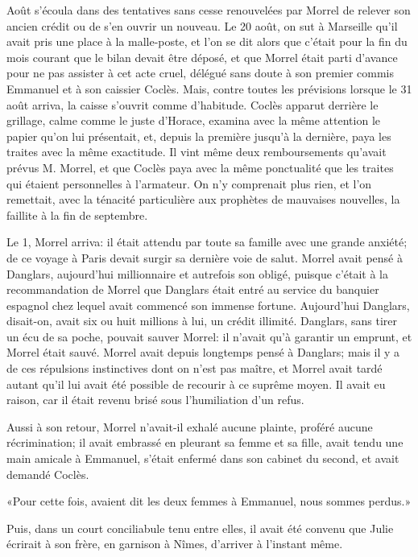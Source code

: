 Août s'écoula dans des tentatives sans cesse renouvelées par Morrel de relever son ancien crédit ou de s'en ouvrir un nouveau. Le 20 août, on sut à Marseille qu'il avait pris une place à la malle-poste, et l'on se dit alors que c'était pour la fin du mois courant que le bilan devait être déposé, et que Morrel était parti d'avance pour ne pas assister à cet acte cruel, délégué sans doute à son premier commis Emmanuel et à son caissier Coclès. Mais, contre toutes les prévisions lorsque le 31 août arriva, la caisse s'ouvrit comme d'habitude. Coclès apparut derrière le grillage, calme comme le juste d'Horace, examina avec la même attention le papier qu'on lui présentait, et, depuis la première jusqu'à la dernière, paya les traites avec la même exactitude. Il vint même deux remboursements qu'avait prévus M. Morrel, et que Coclès paya avec la même ponctualité que les traites qui étaient personnelles à l'armateur. On n'y comprenait plus rien, et l'on remettait, avec la ténacité particulière aux prophètes de mauvaises nouvelles, la faillite à la fin de septembre.

Le 1\ier, Morrel arriva: il était attendu par toute sa famille avec une grande anxiété; de ce voyage à Paris devait surgir sa dernière voie de salut. Morrel avait pensé à Danglars, aujourd'hui millionnaire et autrefois son obligé, puisque c'était à la recommandation de Morrel que Danglars était entré au service du banquier espagnol chez lequel avait commencé son immense fortune. Aujourd'hui Danglars, disait-on, avait six ou huit millions à lui, un crédit illimité. Danglars, sans tirer un écu de sa poche, pouvait sauver Morrel: il n'avait qu'à garantir un emprunt, et Morrel était sauvé. Morrel avait depuis longtemps pensé à Danglars; mais il y a de ces répulsions instinctives dont on n'est pas maître, et Morrel avait tardé autant qu'il lui avait été possible de recourir à ce suprême moyen. Il avait eu raison, car il était revenu brisé sous l'humiliation d'un refus.

Aussi à son retour, Morrel n'avait-il exhalé aucune plainte, proféré aucune récrimination; il avait embrassé en pleurant sa femme et sa fille, avait tendu une main amicale à Emmanuel, s'était enfermé dans son cabinet du second, et avait demandé Coclès.

«Pour cette fois, avaient dit les deux femmes à Emmanuel, nous sommes perdus.»

Puis, dans un court conciliabule tenu entre elles, il avait été convenu que Julie écrirait à son frère, en garnison à Nîmes, d'arriver à l'instant même.

